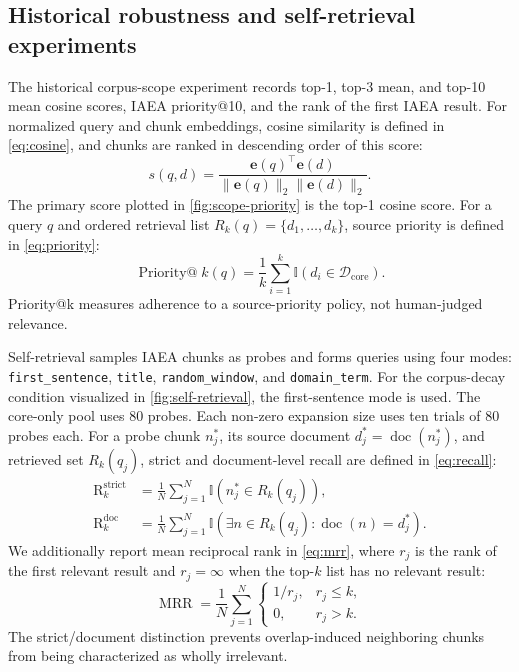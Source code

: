 \subsection{Historical robustness and self-retrieval experiments}
The historical corpus-scope experiment records top-1, top-3 mean, and top-10 mean cosine scores, IAEA priority@10, and the rank of the first IAEA result. For normalized query and chunk embeddings, cosine similarity is defined in \cref{eq:cosine}, and chunks are ranked in descending order of this score:
\begin{equation}
s(q,d)=\frac{\mathbf{e}(q)^\top\mathbf{e}(d)}{\lVert\mathbf{e}(q)\rVert_2\lVert\mathbf{e}(d)\rVert_2}.
\label{eq:cosine}
\end{equation}
The primary score plotted in \cref{fig:scope-priority} is the top-1 cosine score. For a query $q$ and ordered retrieval list $R_k(q)=\{d_1,\ldots,d_k\}$, source priority is defined in \cref{eq:priority}:
\begin{equation}
\operatorname{Priority@}k(q)=\frac{1}{k}\sum_{i=1}^{k}
\mathbb{I}\left(d_i\in\mathcal{D}_{\mathrm{core}}\right).
\label{eq:priority}
\end{equation}
Priority@k measures adherence to a source-priority policy, not human-judged relevance.

Self-retrieval samples IAEA chunks as probes and forms queries using four modes: \texttt{first\_sentence}, \texttt{title}, \texttt{random\_window}, and \texttt{domain\_term}. For the corpus-decay condition visualized in \cref{fig:self-retrieval}, the first-sentence mode is used. The core-only pool uses 80 probes. Each non-zero expansion size uses ten trials of 80 probes each. For a probe chunk $n_j^\ast$, its source document $d_j^\ast=\operatorname{doc}(n_j^\ast)$, and retrieved set $R_k(q_j)$, strict and document-level recall are defined in \cref{eq:recall}:
\begin{equation}
\begin{aligned}
\mathrm{R}^{\mathrm{strict}}_k&=\frac{1}{N}\sum_{j=1}^{N}
\mathbb{I}\left(n_j^\ast\in R_k(q_j)\right),\\
\mathrm{R}^{\mathrm{doc}}_k&=\frac{1}{N}\sum_{j=1}^{N}
\mathbb{I}\left(\exists n\in R_k(q_j):\operatorname{doc}(n)=d_j^\ast\right).
\end{aligned}
\label{eq:recall}
\end{equation}
We additionally report mean reciprocal rank in \cref{eq:mrr}, where $r_j$ is the rank of the first relevant result and $r_j=\infty$ when the top-$k$ list has no relevant result:
\begin{equation}
\operatorname{MRR}=\frac{1}{N}\sum_{j=1}^{N}
\begin{cases}
1/r_j, & r_j\leq k,\\
0, & r_j>k.
\end{cases}
\label{eq:mrr}
\end{equation}
The strict/document distinction prevents overlap-induced neighboring chunks from being characterized as wholly irrelevant.

